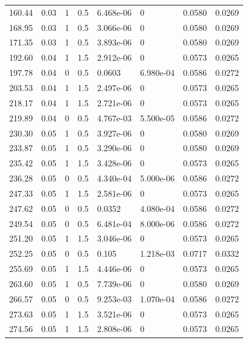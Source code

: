 \documentclass[preview]{standalone}
\begin{document}
{{\begin{tabular}{L{1.2cm}C{1.2cm} C{0.3cm}C{0.5cm} C{1.4cm}C{1.4cm} C{1.4cm}C{1.4cm}}
  160.44  &  0.03  & 1     & 0.5 &  6.468e-06  & 0  & 0.0580 &  0.0269   \\ 
  168.95  &  0.03  & 1     & 0.5 &  3.066e-06  & 0  & 0.0580 &  0.0269   \\ 
  171.35  &  0.03  & 1     & 0.5 &  3.893e-06  & 0  & 0.0580 &  0.0269   \\ 
  192.60  &  0.04  & 1     & 1.5 &  2.912e-06  & 0  & 0.0573 &  0.0265   \\ 
  197.78  &  0.04  & 0     & 0.5 &  0.0603  & 6.980e-04  & 0.0586 &  0.0272   \\ 
  203.53  &  0.04  & 1     & 1.5 &  2.497e-06  & 0  & 0.0573 &  0.0265   \\ 
  218.17  &  0.04  & 1     & 1.5 &  2.721e-06  & 0  & 0.0573 &  0.0265   \\ 
  219.89  &  0.04  & 0     & 0.5 &  4.767e-03  & 5.500e-05  & 0.0586 &  0.0272   \\ 
  230.30  &  0.05  & 1     & 0.5 &  3.927e-06  & 0  & 0.0580 &  0.0269   \\ 
  233.87  &  0.05  & 1     & 0.5 &  3.290e-06  & 0  & 0.0580 &  0.0269   \\ 
  235.42  &  0.05  & 1     & 1.5 &  3.428e-06  & 0  & 0.0573 &  0.0265   \\ 
  236.28  &  0.05  & 0     & 0.5 &  4.340e-04  & 5.000e-06  & 0.0586 &  0.0272   \\ 
  247.33  &  0.05  & 1     & 1.5 &  2.581e-06  & 0  & 0.0573 &  0.0265   \\ 
  247.62  &  0.05  & 0     & 0.5 &  0.0352  & 4.080e-04  & 0.0586 &  0.0272   \\ 
  249.54  &  0.05  & 0     & 0.5 &  6.481e-04  & 8.000e-06  & 0.0586 &  0.0272   \\ 
  251.20  &  0.05  & 1     & 1.5 &  3.046e-06  & 0  & 0.0573 &  0.0265   \\ 
  252.25  &  0.05  & 0     & 0.5 &  0.105  & 1.218e-03  & 0.0717 &  0.0332   \\ 
  255.69  &  0.05  & 1     & 1.5 &  4.446e-06  & 0  & 0.0573 &  0.0265   \\ 
  263.60  &  0.05  & 1     & 0.5 &  7.739e-06  & 0  & 0.0580 &  0.0269   \\ 
  266.57  &  0.05  & 0     & 0.5 &  9.253e-03  & 1.070e-04  & 0.0586 &  0.0272   \\ 
  273.63  &  0.05  & 1     & 1.5 &  3.521e-06  & 0  & 0.0573 &  0.0265   \\ 
  274.56  &  0.05  & 1     & 1.5 &  2.808e-06  & 0  & 0.0573 &  0.0265   \\ 

\end{tabular}}}
\end{document}
